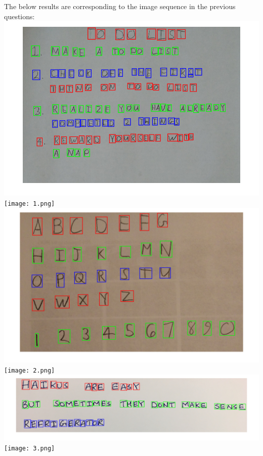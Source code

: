 \documentclass[12pt,letterpaper,boxed]{hmcpset}
\begin{document}
\begin{solution}
The below results are corresponding to the image sequence in the previous questions:\\
\includegraphics[width=\textwidth]{4_3_4.png}\\
\texttt{[image: 1.png]}\\
\includegraphics[width=\textwidth]{4_3_3.png}\\
\texttt{[image: 2.png]}\\
\includegraphics[width=\textwidth]{4_3_2.png}\\
\texttt{[image: 3.png]}\\

\end{solution}
\end{document}
